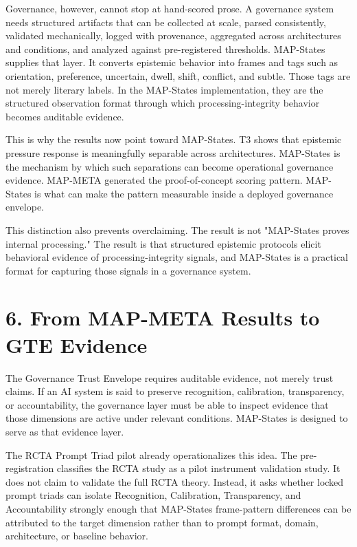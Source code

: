 \documentclass[11pt]{article}
\begin{document}
Governance, however, cannot stop at hand-scored prose. A governance system needs structured artifacts that can be collected at scale, parsed consistently, validated mechanically, logged with provenance, aggregated across architectures and conditions, and analyzed against pre-registered thresholds. MAP-States supplies that layer. It converts epistemic behavior into frames and tags such as orientation, preference, uncertain, dwell, shift, conflict, and subtle. Those tags are not merely literary labels. In the MAP-States implementation, they are the structured observation format through which processing-integrity behavior becomes auditable evidence.

This is why the results now point toward MAP-States. T3 shows that epistemic pressure response is meaningfully separable across architectures. MAP-States is the mechanism by which such separations can become operational governance evidence. MAP-META generated the proof-of-concept scoring pattern. MAP-States is what can make the pattern measurable inside a deployed governance envelope.

This distinction also prevents overclaiming. The result is not "MAP-States proves internal processing." The result is that structured epistemic protocols elicit behavioral evidence of processing-integrity signals, and MAP-States is a practical format for capturing those signals in a governance system.

\section{6. From MAP-META Results to GTE Evidence}
The Governance Trust Envelope requires auditable evidence, not merely trust claims. If an AI system is said to preserve recognition, calibration, transparency, or accountability, the governance layer must be able to inspect evidence that those dimensions are active under relevant conditions. MAP-States is designed to serve as that evidence layer.

The RCTA Prompt Triad pilot already operationalizes this idea. The pre-registration classifies the RCTA study as a pilot instrument validation study. It does not claim to validate the full RCTA theory. Instead, it asks whether locked prompt triads can isolate Recognition, Calibration, Transparency, and Accountability strongly enough that MAP-States frame-pattern differences can be attributed to the target dimension rather than to prompt format, domain, architecture, or baseline behavior.
\end{document}
